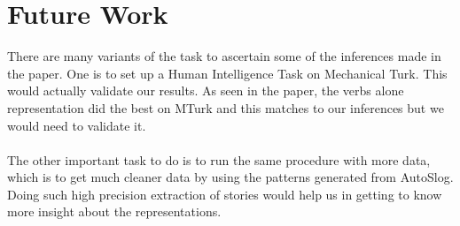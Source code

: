 \documentclass[12pt]{article}
\begin{document}
\section{Future Work}
There are many variants of the task to ascertain some of the inferences made in the paper. One is to set up a Human Intelligence Task on Mechanical Turk. This would actually validate our results. As seen in the \cite{film} paper, the verbs alone representation did the best on MTurk and this matches to our inferences but we would need to validate it. \\
\smallskip \\
The other important task to do is to run the same procedure with more data, which is to get much cleaner data by using the patterns generated from AutoSlog\cite{auto_slog}. Doing such high precision extraction of stories would help us in getting to know more insight about the representations.
 

%
%
\end{document}

